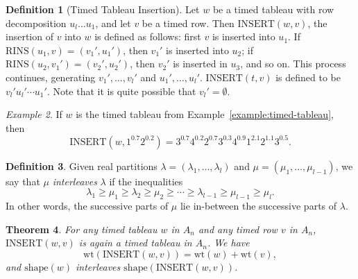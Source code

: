 \documentclass[10pt]{amsproc}
\newtheorem{theorem}{Theorem}[subsection]
\theoremstyle{definition}
\newtheorem{definition}[theorem]{Definition}
\theoremstyle{remark}
\newtheorem{example}[theorem]{Example}
\newcommand{\rowins}{\mathrm{RINS}}
\newcommand{\ins}{\mathrm{INSERT}}
\newcommand{\wt}{\mathrm{wt}}
\newcommand{\shape}{\mathrm{shape}}
\begin{document}
\begin{definition}
  [Timed Tableau Insertion]
  Let $w$ be a timed tableau with row decomposition $u_l\dotsc u_1$, and let $v$ be a timed row.
  Then $\ins(w, v)$, the insertion of $v$ into $w$ is defined as follows:
  first $v$ is inserted into $u_1$.
  If $\rowins(u_1,v)=(v_1',u_1')$, then $v_1'$ is inserted into $u_2$; if $\rowins(u_2,v_1')=(v_2',u_2')$, then $v_2'$ is inserted in $u_3$, and so on.
  This process continues, generating $v_1',\dotsc,v_l'$ and $u_1',\dotsc,u_l'$.
  $\ins(t,v)$ is defined to be $v_l'u_l'\dotsb u_1'$.
  Note that it is quite possible that $v_l'=\emptyset$.
\end{definition}
\begin{example}
  If $w$ is the timed tableau from Example~\ref{example:timed-tableau}, then
  \begin{displaymath}
    \ins(w,1^{0.7}2^{0.2})=3^{0.7}4^{0.2}2^{0.7}3^{0.3}4^{0.9}1^{2.1}2^{1.1}3^{0.5}.
  \end{displaymath}
\end{example}
\begin{definition}
  Given real partitions $\lambda=(\lambda_1,\dotsc,\lambda_l)$ and $\mu=(\mu_1,\dotsc,\mu_{l-1})$, we say that $\mu$ \emph{interleaves} $\lambda$ if the inequalities
  \begin{displaymath}
    \lambda_1 \geq \mu_1 \geq \lambda_2 \geq \mu_2 \geq \dotsb \geq \lambda_{l-1}\geq \mu_{l-1}\geq \mu_l. 
  \end{displaymath}
  In other words, the successive parts of $\mu$ lie in-between the successive parts of $\lambda$.
\end{definition}
\begin{theorem}
  \label{theorem:tableauness-of-insertion}
  For any timed tableau $w$ in $A_n$ and any timed row $v$ in $A_n$, $\ins(w,v)$ is again a timed tableau in $A_n$.
  We have
  \begin{displaymath}
    \wt(\ins(w,v)) = \wt(w) + \wt(v),
  \end{displaymath}
  and $\shape(w)$ interleaves $\shape(\ins(w,v))$.
\end{theorem}
\end{document}
